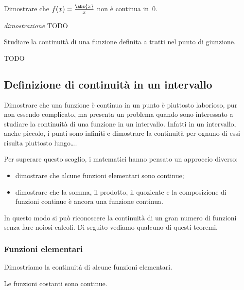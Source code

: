 \begin{esempio}
 Dimostrare che \(f(x)=\frac{\abs{x}}{x}\) non è continua in~0.
 
\emph{dimostrazione}
TODO
 
\end{esempio}

\begin{esempio}
 Studiare la continuità di una funzione definita a tratti nel punto di 
giunzione.
 
TODO
 
\end{esempio}

\subsection{Definizione di continuità in un intervallo}
\label{subsec:cont_definizione}

Dimostrare che una funzione è continua in un punto è piuttosto laborioso, pur 
non essendo complicato, ma presenta un problema quando sono interessato a 
studiare la continuità di una funzione in un intervallo. Infatti in un 
intervallo, anche piccolo, i punti sono infiniti e dimostrare la continuità per 
ognuno di essi risulta piuttosto lungo\dots.

Per superare questo scoglio, i matematici hanno pensato un approccio diverso:

\begin{itemize}
 \item dimostrare che alcune funzioni elementari sono continue;
 \item dimostrare che la somma, il prodotto, il quoziente e la composizione di 
funzioni continue è ancora una funzione continua.
\end{itemize}

In questo modo si può riconoscere la continuità di un gran numero di funzioni 
senza fare noiosi calcoli. Di seguito vediamo qualcuno di questi teoremi.

\subsubsection{Funzioni elementari}
\label{subsubsec:cont_funzionielementari}

Dimostriamo la continuità di alcune funzioni elementari.

\begin{teorema}
Le funzioni costanti sono continue.
\end{teorema}

